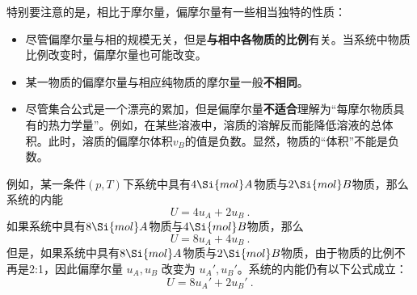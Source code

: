 特别要注意的是，相比于摩尔量，偏摩尔量有一些相当独特的性质：
\begin{itemize}
\item 尽管偏摩尔量与相的规模无关，但是\textbf{与相中各物质的比例}有关。当系统中物质比例改变时，偏摩尔量也可能改变。
\item 某一物质的偏摩尔量与相应纯物质的摩尔量一般\textbf{不相同}。
\item 尽管集合公式是一个漂亮的累加，但是偏摩尔量\textbf{不适合}理解为“每摩尔物质具有的热力学量”。例如，在某些溶液中，溶质的溶解反而能降低溶液的总体积。此时，溶质的偏摩尔体积$v_B$的值是负数。显然，物质的“体积”不能是负数。
\end{itemize}

\begin{example}{}
例如，某一条件$(p,T)$下系统中具有$4 \Si{mol} A$物质与$2 \Si{mol} B$物质，那么系统的内能
$$U = 4 u_{A} +  2 u_B~. $$
如果系统中具有$8 \Si{mol} A$物质与$4 \Si{mol} B$物质，那么
$$U = 8 u_A +  4 u_B~.$$
但是，如果系统中具有$8 \Si{mol} A$物质与$2 \Si{mol} B$物质，由于物质的比例不再是2:1，因此偏摩尔量 $u_A,u_B$ 改变为 $u_A',u_B'$。系统的内能仍有以下公式成立：
$$U = 8 u_A' +  2 u_B'~.$$
\end{example}

